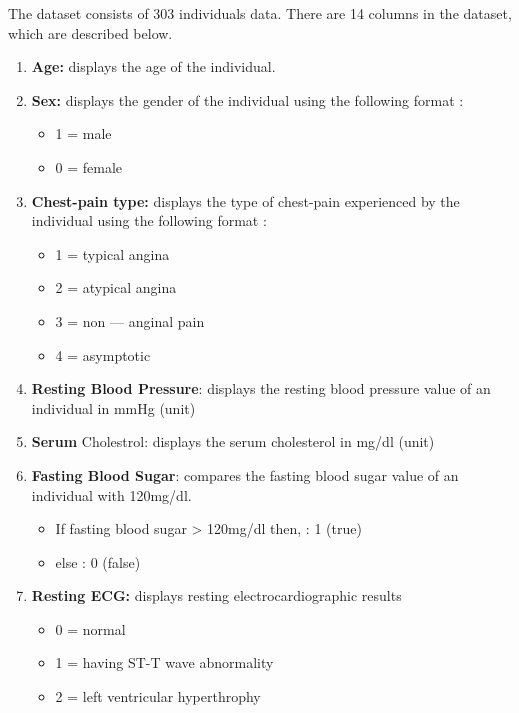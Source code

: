 \documentclass[oneside,12pt]{Classes/VTU}
\begin{document}
  The dataset consists of 303 individuals data. There are 14 columns in the dataset, which    are described below.
  \begin{enumerate}
  	\item\textbf{Age:} displays the age of the individual.
  	
  	\item \textbf{Sex:} displays the gender of the individual using the following format :
  		\begin{itemize}
  			\item 1 = male
  			\item 0 = female
  		\end{itemize}
  	
  	\item \textbf{Chest-pain type:} displays the type of chest-pain experienced by the individual using the following format :
  		\begin{itemize}
  			\item 1 = typical angina
  			\item 2 = atypical angina
  			\item 3 = non — anginal pain
  			\item 4 = asymptotic
  		\end{itemize}
  
  	\item \textbf{Resting Blood Pressure}: displays the resting blood pressure value of an individual in mmHg (unit)
  	
  	\item \textbf{Serum} Cholestrol: displays the serum cholesterol in mg/dl (unit)
  	
  	\item \textbf{Fasting Blood Sugar}: compares the fasting blood sugar value of an individual with 120mg/dl.
  		\begin{itemize}
  			\item If fasting blood sugar > 120mg/dl then, : 1 (true)
  			\item else                                    : 0 (false)
  		\end{itemize}
  	
  	\item \textbf{Resting ECG:} displays resting electrocardiographic results
  	\begin{itemize}
  		\item 0 = normal
  		\item 1 = having ST-T wave abnormality
  		\item 2 = left ventricular hyperthrophy
  	\end{itemize}
  	

\end{enumerate}
\end{document}
